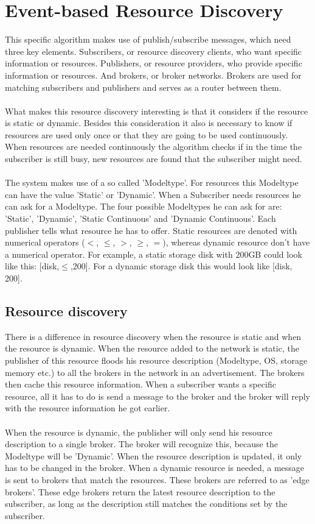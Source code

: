 	\section{Event-based Resource Discovery}
		This specific algorithm makes use of publish/subscribe messages, which need three key elements.
		Subscribers, or resource discovery clients, who want specific information or resources. Publishers, or 
		resource providers, who provide specific information or resources. And brokers, or broker networks.
		Brokers are used for matching subscribers and publishers and serves as a router between them.\\
		\\
		What makes this resource discovery interesting is that it considers if the resource is static or 
		dynamic. Besides this consideration it also is necessary to know if resources are used only once or 
		that they are going to be used continuously. When resources are needed continuously the algorithm 
		checks if in the time the subscriber is still busy, new resources are found that the subscriber might 
		need. \\
		\\
		The system makes use of a so called 'Modeltype'. For resources this Modeltype can have the 
		value 'Static' or 'Dynamic'. When a Subscriber needs resources he can ask for a Modeltype. The four 
		possible Modeltypes he can ask for are: 'Static', 'Dynamic', 'Static Continuous' and 'Dynamic 
		Continuous'. Each publisher tells what resource he has to offer. Static resources are denoted with 
		numerical operators ($<$, $\le$, $>$, $\ge$, $=$), whereas dynamic resource don't have a numerical operator. For 
		example, a static storage disk with 200GB could look like this: [disk,$\le$,200]. For a dynamic storage 
		disk this would look like [disk, 200].
		
		\subsection{Resource discovery}
		There is a difference in resource discovery when the resource is static and when the resource is 
		dynamic. When the resource added to the network is static, the publisher of this resource floods his 
		resource description (Modeltype, OS, storage memory etc.) to all the brokers in the network in an 
		advertisement. The brokers then cache this resource information. When a subscriber wants a specific 
		resource, all it has to do is send a message to the broker and the broker will reply with the resource 
		information he got earlier.\\
		\\
		When the resource is dynamic, the publisher will only send his resource 
		description to a single broker. The broker will recognize this, because the Modeltype will be 'Dynamic'. When 
		the resource description is updated, it only has to be changed in the broker. When a dynamic 
		resource is needed, a message is sent to brokers that match the resources. These brokers are 
		referred to as 'edge brokers'. These edge brokers return the latest resource description to the 
		subscriber, as long as the description still matches the conditions set by the subscriber.
		
